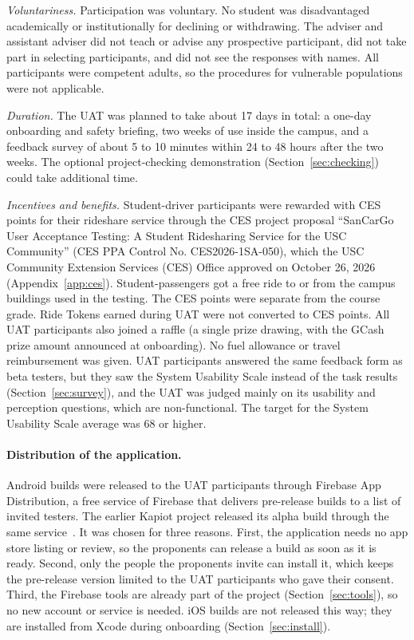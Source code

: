 \textit{Voluntariness.} Participation was voluntary. No student was disadvantaged academically or institutionally for declining or withdrawing. The adviser and assistant adviser did not teach or advise any prospective participant, did not take part in selecting participants, and did not see the responses with names. All participants were competent adults, so the procedures for vulnerable populations were not applicable.

\textit{Duration.} The UAT was planned to take about 17 days in total: a one-day onboarding and safety briefing, two weeks of use inside the campus, and a feedback survey of about 5 to 10 minutes within 24 to 48 hours after the two weeks. The optional project-checking demonstration (Section~\ref{sec:checking}) could take additional time.

\textit{Incentives and benefits.} Student-driver participants were rewarded with CES points for their rideshare service through the CES project proposal ``SanCarGo User Acceptance Testing: A Student Ridesharing Service for the USC Community'' (CES PPA Control No. CES2026-1SA-050), which the USC Community Extension Services (CES) Office approved on October 26, 2026 (Appendix~\ref{app:ces}). Student-passengers got a free ride to or from the campus buildings used in the testing. The CES points were separate from the course grade. Ride Tokens earned during UAT were not converted to CES points. All UAT participants also joined a raffle (a single prize drawing, with the GCash prize amount announced at onboarding). No fuel allowance or travel reimbursement was given. UAT participants answered the same feedback form as beta testers, but they saw the System Usability Scale instead of the task results (Section~\ref{sec:survey}), and the UAT was judged mainly on its usability and perception questions, which are non-functional. The target for the System Usability Scale average was 68 or higher.

\paragraph{Distribution of the application.}\label{sec:distribution}
Android builds were released to the UAT participants through Firebase App Distribution, a free service of Firebase that delivers pre-release builds to a list of invited testers. The earlier Kapiot project released its alpha build through the same service~\cite{pepito2022}. It was chosen for three reasons. First, the application needs no app store listing or review, so the proponents can release a build as soon as it is ready. Second, only the people the proponents invite can install it, which keeps the pre-release version limited to the UAT participants who gave their consent. Third, the Firebase tools are already part of the project (Section~\ref{sec:tools}), so no new account or service is needed. iOS builds are not released this way; they are installed from Xcode during onboarding (Section~\ref{sec:install}).

